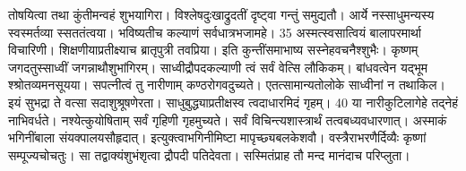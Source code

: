 तोषयित्वा तथा कुंतीमन्वहं शुभयागिरा।
 विश्लेषदुःखाद्रुदतीं दृष्ट्वा गन्तुं समुद्यतौ।
 आर्ये नस्साधुमन्यस्य स्वस्मर्तव्या स्सततंत्वया।
 भविष्यतीच कल्याणं सर्वधात्रभजामहे।
 35 अस्मत्स्वसात्वियं बालापरमार्था विचारिणी।
 शिक्षणीयाप्रतीक्ष्याच ब्रातृपुत्री तवप्रिया।
 इति कुन्तींसमाभाष्य सस्नेहवचनैश्शुभैः।
 कृष्णम् जगदतुस्साध्वीं जगन्नाथौशुभांगिरम्।
 साध्वीद्रौपदकल्याणी त्वं सर्वं वेत्सि लौकिकम्।
 बांधवत्वेन यद्भूम श्श्रोतव्यमनसूयया।
 सपत्नीत्वं तु नारीणाम् कण्ठरोगवदुच्यते।
 एतत्सामान्यतोलोके साध्वीनां न तथाकिल।
 इयं सुभद्रा ते वत्सा सदाशुश्रूषणेरता।
 साधुबुद्ध्याप्रतीक्षस्व त्वदाधारमिदं गृहम्।
 40 या नारीकुटिलागेहे तद्नेहं नाभिवर्धते।
 नश्येत्कुयोषिताम् सर्वं गृहिणी गृहमुच्यते।
 सर्वं विचिन्त्यशास्त्रार्थं तत्वबध्यवधारणात्।
 अस्माकं भगिनींबाला संयक्पालयसौहृदात्।
 इत्युक्त्वाभगिनीमिष्टा मापृच्छ्यबलकेशवौ।
 वस्त्रैराभरणैर्दिव्यैः कृष्णां सम्पूज्यचोचतुः।
 सा तद्वाक्यंशुभंशृत्वा द्रौपदी पतिदेवता।
 सस्मितंप्राह तौ मन्द मानंदाच परिप्लुता।
 
